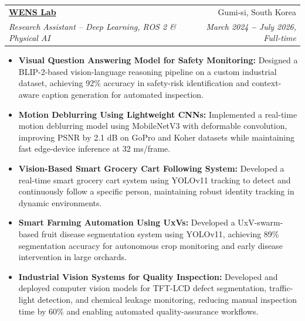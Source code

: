 \documentclass[letterpaper,11pt]{article}
\makeatletter
\newcommand{\resumeItem}[1]{
  \item\small{
    {#1 \vspace{-2pt}}
  }
}
\newcommand{\resumeSubheading}[4]{
  \vspace{-2pt}\item
    \begin{tabular*}{0.97\textwidth}[t]{l@{\extracolsep{\fill}}r}
      \textbf{#1} & #2 \\
      \textit{\small#3} & \textit{\small #4} \\
    \end{tabular*}\vspace{-7pt}
}
\newcommand{\resumeItemListStart}{\begin{itemize}}
\newcommand{\resumeItemListEnd}{\end{itemize}\vspace{-5pt}}
\makeatother
\begin{document}


\resumeSubheading
{\href{https://wens.kumoh.ac.kr/}{WENS Lab}}{Gumi-si, South Korea}
{Research Assistant -- Deep Learning, ROS 2 \& Physical AI}{March 2024 \textbf{--} July 2026, Full-time}
\resumeItemListStart
\justifying

\resumeItem{\textbf{Visual Question Answering Model for Safety Monitoring:} Designed a BLIP-2-based vision-language reasoning pipeline on a custom industrial dataset, achieving 92\% accuracy in safety-risk identification and context-aware caption generation for automated inspection.}

\resumeItem{\textbf{Motion Deblurring Using Lightweight CNNs:} Implemented a real-time motion deblurring model using MobileNetV3 with deformable convolution, improving PSNR by 2.1 dB on GoPro and Koher datasets while maintaining fast edge-device inference at 32 ms/frame.}

\resumeItem{\textbf{Vision-Based Smart Grocery Cart Following System:} Developed a real-time smart grocery cart system using YOLOv11 tracking to detect and continuously follow a specific person, maintaining robust identity tracking in dynamic environments.}

\resumeItem{\textbf{Smart Farming Automation Using UxVs:} Developed a UxV-swarm-based fruit disease segmentation system using YOLOv11, achieving 89\% segmentation accuracy for autonomous crop monitoring and early disease intervention in large orchards.}


\resumeItem{\textbf{Industrial Vision Systems for Quality Inspection:} Developed and deployed computer vision models for TFT-LCD defect segmentation, traffic-light detection, and chemical leakage monitoring, reducing manual inspection time by 60\% and enabling automated quality-assurance workflows.}

\resumeItemListEnd
\end{document}
